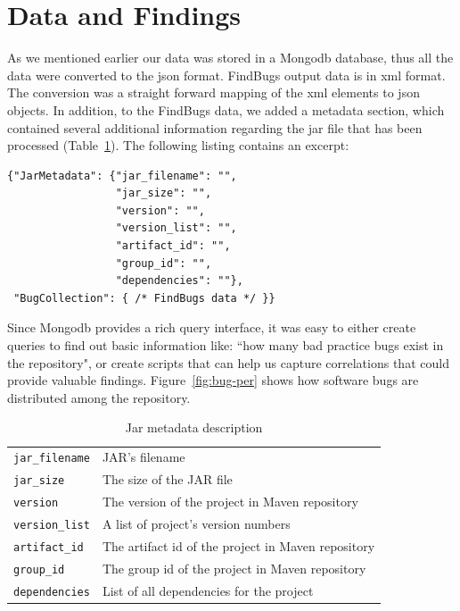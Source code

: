 \documentclass{sig-alternate}
\begin{document}
\section{Data and Findings}
\label{sec:find}

As we mentioned earlier our data was stored in a
Mongo{\sc db} database, thus all the data were 
converted to the {\sc json} format. FindBugs output data is in {\sc xml} format. The conversion was a straight forward mapping
of the {\sc xml} elements to {\sc json} objects. In addition, to the FindBugs data, we added a metadata section, which contained
several additional information regarding the jar file that has been processed (Table~\ref{tbl:metadata-description}). The following listing contains an excerpt:

\begin{verbatim}
{"JarMetadata": {"jar_filename": "",
                 "jar_size": "",
                 "version": "",
                 "version_list": "",
                 "artifact_id": "",
                 "group_id": "",
                 "dependencies": ""}, 
 "BugCollection": { /* FindBugs data */ }}
\end{verbatim}

Since Mongo{\sc db} provides a rich query interface, it was easy to either create
queries to find out basic information like:
``how many bad practice bugs exist in the repository", or
create scripts that can help us capture correlations
that could provide valuable findings. Figure~\ref{fig:bug-per} shows how software 
bugs are distributed among the repository.

\begin{table}
\centering
\caption{Jar metadata description}
\label{tbl:metadata-description}
\begin{tabular}{l p{5.0cm}}
 \hline
\verb|jar_filename| & JAR's filename\\
\verb|jar_size| & The size of the JAR file\\
\verb|version| & The version of the project in Maven repository\\
\verb|version_list| & A list of project's version numbers\\
\verb|artifact_id| & The artifact id of the project in Maven repository\\
\verb|group_id| & The group id of the project in Maven repository\\
\verb|dependencies| & List of all dependencies for the project\\
 \hline
 \end{tabular}
\end{table}
\end{document}
